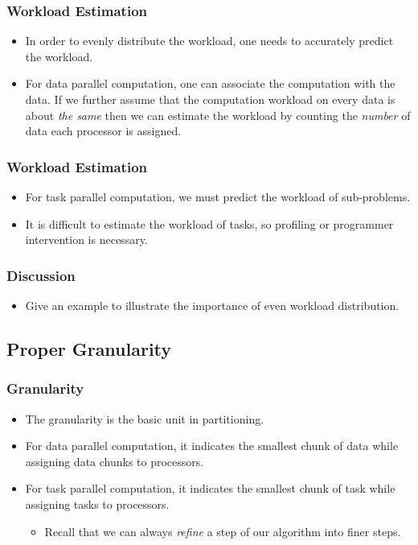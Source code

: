 \documentclass{beamer}
\begin{document}
\begin{CJK}{UTF8}{bsmi}
\begin{frame}
\frametitle{Workload Estimation}
\begin{itemize}
\item In order to evenly distribute the workload, one needs to
  accurately predict the workload.
\item For data parallel computation, one can associate the computation
  with the data.  If we further assume that the computation workload on
  every data is about {\em the same} then we can estimate the workload
  by counting the {\em number} of data each processor is assigned.
\end{itemize}
\end{frame}

\begin{frame}
\frametitle{Workload Estimation}
\begin{itemize}
\item For task parallel computation, we must predict the workload of
  sub-problems.
\item It is difficult to estimate the workload of tasks, so profiling
  or programmer intervention is necessary.
\end{itemize}
\end{frame}

\begin{frame}
\frametitle{Discussion}
\begin{itemize}
\item Give an example to illustrate the importance of even workload
  distribution.
\end{itemize}
\end{frame}

\subsection{Proper Granularity}

\begin{frame}
\frametitle{Granularity}
\begin{itemize}
\item The granularity is the basic unit in partitioning.
\item For data parallel computation, it indicates the smallest chunk
  of data while assigning data chunks to processors.
\item For task parallel computation, it indicates the smallest chunk
  of task while assigning tasks to processors.
\begin{itemize}
\item Recall that we can always {\em refine} a step of our algorithm
  into finer steps.
\end{itemize}
\end{itemize}
\end{frame}


\end{CJK}
\end{document}
